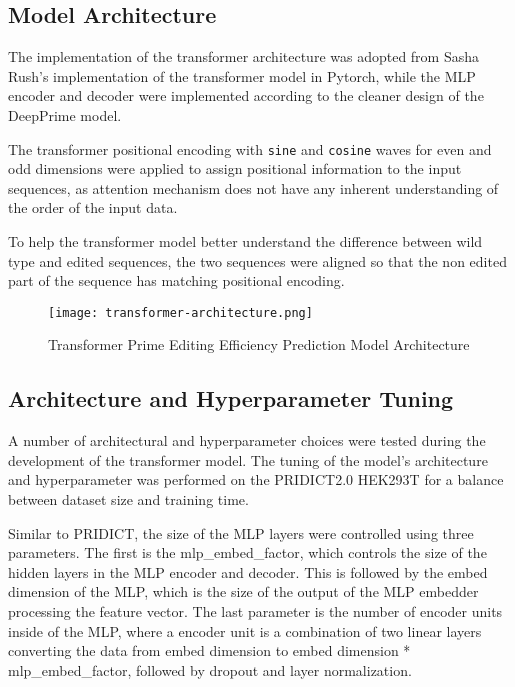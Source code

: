 \subsection{Model Architecture}

The implementation of the transformer architecture was adopted from Sasha Rush's implementation of the transformer model in Pytorch\cite{AnnotatedTransformer}, while the MLP encoder and decoder were implemented according to the cleaner design of the DeepPrime model.

The transformer positional encoding with \verb|sine| and \verb|cosine| waves for even and odd dimensions were applied to assign positional information to the input sequences, as attention mechanism does not have any inherent understanding of the order of the input data. 

To help the transformer model better understand the difference between wild type and edited sequences, the two sequences were aligned so that the non edited part of the sequence has matching positional encoding. 

\begin{figure}
    \centering
    \texttt{[image: transformer-architecture.png]}
    \caption[Transformer Model Architecture]{Transformer Prime Editing Efficiency Prediction Model Architecture}
    \label{fig:transformer-model}
\end{figure}

\subsection{Architecture and Hyperparameter Tuning}

A number of architectural and hyperparameter choices were tested during the development of the transformer model.
The tuning of the model's architecture and hyperparameter was performed on the PRIDICT2.0 HEK293T for a balance between dataset size and training time.

Similar to PRIDICT, the size of the MLP layers were controlled using three parameters. The first is the mlp\_embed\_factor, which controls the size of the hidden layers in the MLP encoder and decoder. This is followed by the embed dimension of the MLP, which is the size of the output of the MLP embedder processing the feature vector. The last parameter is the number of encoder units inside of the MLP, where a encoder unit is a combination of two linear layers converting the data from embed dimension to embed dimension * mlp\_embed\_factor, followed by dropout and layer normalization.

